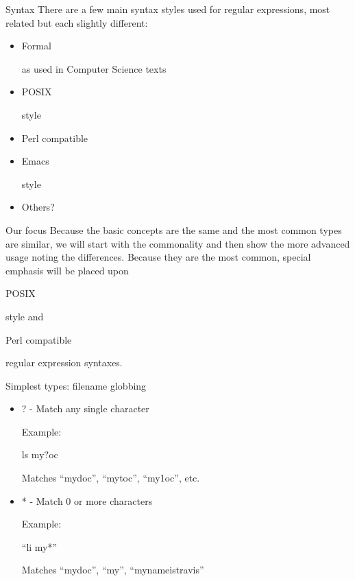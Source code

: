 \documentclass[ps,colorBG,contemporain]{prosper}
\begin{document}
\begin{slide}{Syntax} There are a few main syntax styles used for regular expressions, most related but each slightly different: \begin{itemize}
\item \begin{em}Formal\end{em} as used in Computer Science texts
\item \begin{em}POSIX\end{em} style
\item \begin{em}Perl compatible\end{em}
\item \begin{em}Emacs\end{em} style
\item Others?
\end{itemize}
\end{slide}

\begin{slide}{Our focus} Because the basic concepts are the same and the most common types are similar, we will start with the commonality and then show the more advanced usage noting the differences.  Because they are the most common, special emphasis will be placed upon \begin{em}POSIX\end{em} style and \begin{em}Perl compatible\end{em} regular expression syntaxes.  \end{slide}

\begin{slide}{Simplest types: filename globbing}\begin{itemize}
\item    ? - Match any single character    

 Example:

ls my?oc

Matches ``mydoc'', ``mytoc'', ``my1oc'', etc.
\item    * - Match 0 or more characters      

Example:

``li my*''

Matches ``mydoc'', ``my'', ``mynameistravis''
\end{itemize}
\end{slide}
\end{document}
